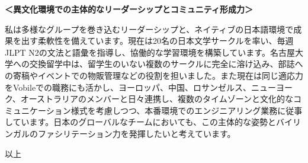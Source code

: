 \documentclass[dvipdfmx,a4paper]{jsarticle}
\begin{document}
\textbf{＜異文化環境での主体的なリーダーシップとコミュニティ形成力＞}

私は多様なグループを巻き込むリーダーシップと、ネイティブの日本語環境で成果を出す柔軟性を備えています。現在は20名の日本文学サークルを率い、毎週JLPT N2の文法と語彙を指導し、協働的な学習環境を構築しています。名古屋大学への交換留学中は、留学生のいない複数のサークルに完全に溶け込み、部誌への寄稿やイベントでの物販管理などの役割を担いました。また現在は同じ適応力をVobileでの職務にも活かし、ヨーロッパ、中国、ロサンゼルス、ニューヨーク、オーストラリアのメンバーと日々連携し、複数のタイムゾーンと文化的なコミュニケーション様式を考慮しつつ、本番環境でのエンジニアリング業務に従事しています。日本のグローバルなチームにおいても、この主体的な姿勢とバイリンガルのファシリテーション力を発揮したいと考えています。

\begin{flushright}
以上
\end{flushright}
\end{document}
